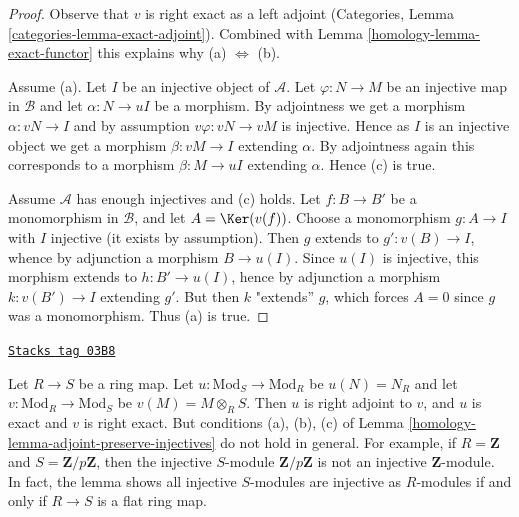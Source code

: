 \begin{proof}

Observe that $v$ is right exact as a left adjoint (Categories, Lemma
\ref{categories-lemma-exact-adjoint}). Combined with
Lemma \ref{homology-lemma-exact-functor} this explains why (a) $\Leftrightarrow$ (b).

\medskip\noindent
Assume (a). Let $I$ be an injective object of $\mathcal{A}$.
Let $\varphi : N \to M$ be an injective map in $\mathcal{B}$ and let
$\alpha : N \to uI$ be a morphism.
By adjointness we get a morphism $\alpha : vN \to I$ and
by assumption $v\varphi : vN \to vM$ is injective.
Hence as $I$ is an injective object we get a morphism
$\beta : vM \to I$ extending $\alpha$. By adjointness
again this corresponds to a morphism $\beta : M \to uI$ extending $\alpha$.
Hence (c) is true.

\medskip\noindent
Assume $\mathcal{A}$ has enough injectives and (c) holds.
Let  $f : B \to B'$ be a monomorphism in $\mathcal{B}$, and let
$A = \Ker(v(f))$. Choose a monomorphism $g : A \to I$ with $I$ injective
(it exists by assumption). Then $g$ extends to $g' : v(B) \to I$,
whence by adjunction a morphism $B \to u(I)$. Since $u(I)$ is injective,
this morphism extends to $h : B' \to u(I)$, hence by adjunction a morphism
$k : v(B') \to I$ extending $g'$. But then $k$ "extends'' $g$,
which forces $A = 0$ since $g$ was a monomorphism. Thus (a) is true.
\end{proof}

\begin{remark}
\label{homology-remark-need-left-exactness}
\href{https://stacks.math.columbia.edu/tag/03B8}{\texttt{Stacks tag 03B8}}

Let $R \to S$ be a ring map. Let $u : \text{Mod}_S \to \text{Mod}_R$
be $u(N) = N_R$ and let $v : \text{Mod}_R \to \text{Mod}_S$ be
$v(M) = M \otimes_R S$. Then $u$ is right adjoint to $v$, and $u$ is
exact and $v$ is right exact. But conditions (a), (b), (c) of
Lemma \ref{homology-lemma-adjoint-preserve-injectives} do not hold in general.
For example, if $R = \mathbf{Z}$ and $S = \mathbf{Z}/p\mathbf{Z}$, then
the injective $S$-module $\mathbf{Z}/p\mathbf{Z}$ is not
an injective $\mathbf{Z}$-module. In fact, the lemma shows
all injective $S$-modules are injective as $R$-modules if and only
if $R \to S$ is a flat ring map.
\end{remark}


